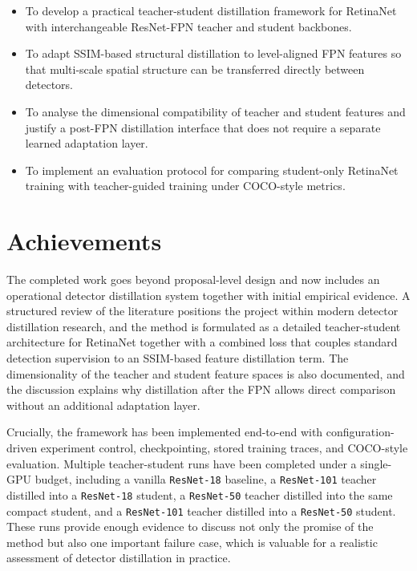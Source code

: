 \begin{itemize}
    \item To develop a practical teacher-student distillation framework for RetinaNet with interchangeable ResNet-FPN teacher and student backbones.
    \item To adapt SSIM-based structural distillation to level-aligned FPN features so that multi-scale spatial structure can be transferred directly between detectors.
    \item To analyse the dimensional compatibility of teacher and student features and justify a post-FPN distillation interface that does not require a separate learned adaptation layer.
    \item To implement an evaluation protocol for comparing student-only RetinaNet training with teacher-guided training under COCO-style metrics.
\end{itemize}

\section{Achievements}
The completed work goes beyond proposal-level design and now includes an operational detector distillation system together with initial empirical evidence. A structured review of the literature positions the project within modern detector distillation research, and the method is formulated as a detailed teacher-student architecture for RetinaNet together with a combined loss that couples standard detection supervision to an SSIM-based feature distillation term. The dimensionality of the teacher and student feature spaces is also documented, and the discussion explains why distillation after the FPN allows direct comparison without an additional adaptation layer.

Crucially, the framework has been implemented end-to-end with configuration-driven experiment control, checkpointing, stored training traces, and COCO-style evaluation. Multiple teacher-student runs have been completed under a single-GPU budget, including a vanilla \texttt{ResNet-18} baseline, a \texttt{ResNet-101} teacher distilled into a \texttt{ResNet-18} student, a \texttt{ResNet-50} teacher distilled into the same compact student, and a \texttt{ResNet-101} teacher distilled into a \texttt{ResNet-50} student. These runs provide enough evidence to discuss not only the promise of the method but also one important failure case, which is valuable for a realistic assessment of detector distillation in practice.

